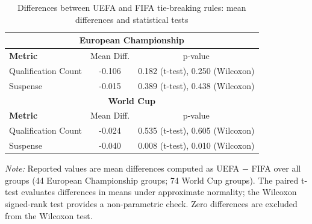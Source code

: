 \begin{table}[H]
\centering
\small
\caption{Differences between UEFA and FIFA tie-breaking rules: mean differences and statistical tests}
\label{tab:tests_diff}
\begin{threeparttable}
\begin{tabular}{lcc}
\toprule
\multicolumn{3}{c}{\textbf{European Championship}} \\
\midrule
\textbf{Metric} & Mean Diff. & p-value \\
\midrule
Qualification Count & -0.106 & 0.182 (t-test), 0.250 (Wilcoxon) \\
Suspense            & -0.015 & 0.389 (t-test), 0.438 (Wilcoxon) \\
\midrule
\multicolumn{3}{c}{\textbf{World Cup}} \\
\midrule
\textbf{Metric} & Mean Diff. & p-value \\
\midrule
Qualification Count & -0.024 & 0.535 (t-test), 0.605 (Wilcoxon) \\
Suspense            & -0.040 & 0.008 (t-test), 0.010 (Wilcoxon) \\
\bottomrule
\end{tabular}
\begin{tablenotes}[flushleft]
\small
\item \textit{Note:} Reported values are mean differences computed as UEFA $-$ FIFA over all groups
(44 European Championship groups; 74 World Cup groups). The paired t-test evaluates
differences in means under approximate normality; the Wilcoxon signed-rank test provides
a non-parametric check. Zero differences are excluded from the Wilcoxon test.
\end{tablenotes}
\end{threeparttable}
\end{table}
